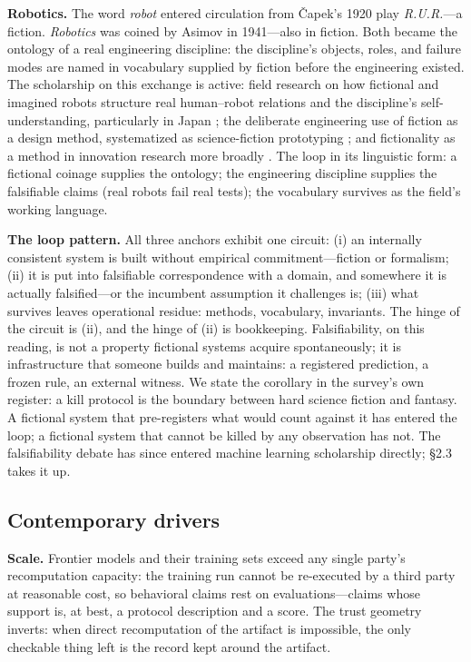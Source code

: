 \documentclass[11pt,a4paper]{article}
\begin{document}
\textbf{Robotics.} The word \textit{robot} entered circulation from Čapek's 1920 play \textit{R.U.R.}—a fiction. \textit{Robotics} was coined by Asimov in 1941—also in fiction. Both became the ontology of a real engineering discipline: the discipline's objects, roles, and failure modes are named in vocabulary supplied by fiction before the engineering existed. The scholarship on this exchange is active: field research on how fictional and imagined robots structure real human–robot relations and the discipline's self-understanding, particularly in Japan \cite{key19}; the deliberate engineering use of fiction as a design method, systematized as science-fiction prototyping \cite{key20}; and fictionality as a method in innovation research more broadly \cite{key21}. The loop in its linguistic form: a fictional coinage supplies the ontology; the engineering discipline supplies the falsifiable claims (real robots fail real tests); the vocabulary survives as the field's working language.

\textbf{The loop pattern.} All three anchors exhibit one circuit: (i) an internally consistent system is built without empirical commitment—fiction or formalism; (ii) it is put into falsifiable correspondence with a domain, and somewhere it is actually falsified—or the incumbent assumption it challenges is; (iii) what survives leaves operational residue: methods, vocabulary, invariants. The hinge of the circuit is (ii), and the hinge of (ii) is bookkeeping. Falsifiability, on this reading, is not a property fictional systems acquire spontaneously; it is infrastructure that someone builds and maintains: a registered prediction, a frozen rule, an external witness. We state the corollary in the survey's own register: a kill protocol is the boundary between hard science fiction and fantasy. A fictional system that pre-registers what would count against it has entered the loop; a fictional system that cannot be killed by any observation has not. The falsifiability debate has since entered machine learning scholarship directly; §2.3 takes it up.

\subsection{Contemporary drivers}

\textbf{Scale.} Frontier models and their training sets exceed any single party's recomputation capacity: the training run cannot be re-executed by a third party at reasonable cost, so behavioral claims rest on evaluations—claims whose support is, at best, a protocol description and a score. The trust geometry inverts: when direct recomputation of the artifact is impossible, the only checkable thing left is the record kept around the artifact.
\end{document}
